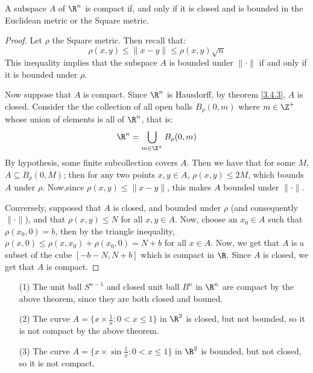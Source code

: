 \begin{theorem}\label{3.6.2}
    A subspace $A$ of  $\R^n$ is compact if, and only if it is closed and  is
    bounded in the Euclidean metric or the Square metric.
\end{theorem}
\begin{proof}
    Let $\rho$ the Square metric. Then recall that:
    \begin{equation}
        \rho(x,y) \leq \|x-y\| \leq \rho(x,y)\sqrt{n}
    \end{equation}
    This inequality implies that the subspace $A$ is bounded under  $\|\cdot\|$
    if and only if it is bounded under  $\rho$.

    Now suppose that  $A$ is compact. Since  $\R^n$ is Hausdorff, by theorem
    \ref{3.4.3}, $A$ is closed. Consider the the collection of all open balls
    $B_\rho(0,m)$ where $m \in \Z^+$ whose union of elements is all of $\R^n$,
    that is:
    \begin{equation*}
        \R^n = \bigcup_{m \in \Z^+}{B_\rho(0,m)}
    \end{equation*}
    By hypothesis, some finite subcollection covers $A$. Then we have that for
    some  $M$, $A \subseteq B_\rho(0,M)$; then for any two points $x,y \in A$,
    $\rho(x,y) \leq 2M$, which bounds $A$ under  $\rho$. Now,since $\rho(x,y)
    \leq \|x-y\|$, this makes $A$ bounded under $\|\cdot\|$.

    Conversely, supposed that  $A$ is closed, and bounded under  $\rho$ (and
    consequently $\|\cdot\|$), and that $\rho(x,y) \leq N$ for all $x,y \in A$.
    Now, choose an  $x_0 \in A$ such that $\rho(x_0,0)=b$, then by the triangle
    inequality, $\rho(x,0) \leq \rho(x,x_0)+\rho(x_0,0)=N+b$ for all $x \in A$.
    Now, we get that $A$ is a subset of the cube $[-b-N,N+b]$ which is compact
    in $\R$. Since  $A$ is closed, we get that  $A$ is compact.
\end{proof}

\begin{example}\label{3.10}
    \begin{enumerate}
        \item[(1)] The unit ball $S^{n-1}$ and closed unit ball $B^n$ in  $\R^n$
            are compact by the above theorem, since they are both closed and
            bouned.

        \item[(2)] The curve $A=\{x \times \frac{1}{x} : 0 < x \leq 1\}$ in
            $\R^2$ is closed, but not bounded, so it is not compact by the above
            theorem.

        \item[(3)] The curve $A=\{x \times \sin{\frac{1}{x}} : 0 < x \leq 1\}$
            in $\R^2$ is bounded, but not closed, so it is not compact.
    \end{enumerate}
\end{example}

